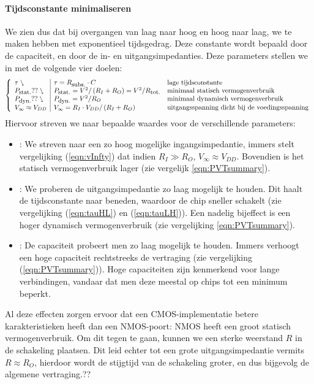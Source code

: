 \paragraph{Tijdsconstante minimaliseren}
We zien dus dat bij overgangen van laag naar hoog en hoog naar laag, we te maken hebben met exponentieel tijdsgedrag. Deze constante wordt bepaald door de capaciteit, en door de in- en uitgangsimpedanties. Deze parameters stellen we in met de volgende vier doelen:
\begin{equation}
\left\{\begin{array}{l|ll}
\tau\ssearrow&\tau=R_{\mbox{\small{subs.}}}\cdot C&\mbox{lage tijdsconstante}\\
P_{\mbox{\small{stat.}}}??\ssearrow&P_{\mbox{\small{stat.}}}=V^2/\left(R_I+R_O\right)=V^2/R_{\mbox{\small{tot.}}}&\mbox{minimaal statisch vermogenverbruik}\\
P_{\mbox{\small{dyn.}}}??\ssearrow&P_{\mbox{\small{dyn.}}}=V^2/R_O&\mbox{minimaal dynamisch vermogenverbruik}\\
V_{\infty}\approx V_{DD}&V_{\infty}=R_I\cdot V_{DD}/\left(R_I+R_O\right)&\mbox{uitgangsspanning dicht bij de voedingsspanning}\\
\end{array}\right.
\label{eqn:PVTsummary}
\end{equation}
Hiervoor streven we naar bepaalde waardes voor de verschillende parameters:
\begin{itemize}
 \item {}: We streven naar een zo hoog mogelijke ingangsimpedantie, immers stelt vergelijking (\ref{eqn:vInfty}) dat indien $R_I\gg R_O$, $V_{\infty}\approx V_{DD}$. Bovendien is het statisch vermogenverbruik lager (zie vergelijk \ref{eqn:PVTsummary}).
 \item {}: We proberen de uitgangsimpedantie zo laag mogelijk te houden. Dit haalt de tijdsconstante naar beneden, waardoor de chip sneller schakelt (zie vergelijking (\ref{eqn:tauHL}) en (\ref{eqn:tauLH})). Een nadelig bijeffect is een hoger dynamisch vermogenverbruik (zie vergelijking \ref{eqn:PVTsummary}).
 \item {}: De capaciteit probeert men zo laag mogelijk te houden. Immers verhoogt een hoge capaciteit rechtstreeks de vertraging (zie vergelijking (\ref{eqn:PVTsummary})). Hoge capaciteiten zijn kenmerkend voor lange verbindingen, vandaar dat men deze meestal op chips tot een minimum beperkt.
\end{itemize}
Al deze effecten zorgen ervoor dat een CMOS-implementatie betere karakteristieken heeft dan een NMOS-poort: NMOS heeft een groot statisch vermogenverbruik. Om dit tegen te gaan, kunnen we een sterke weerstand $R$ in de schakeling plaatsen. Dit leid echter tot een grote uitgangsimpedantie vermits $R\approx R_O$, hierdoor wordt de stijgtijd van de schakeling groter, en dus bijgevolg de algemene vertraging.??%
